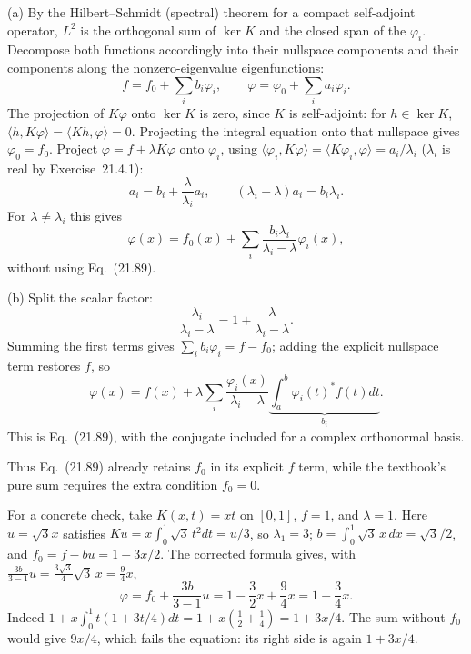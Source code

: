 (a) By the Hilbert--Schmidt (spectral) theorem for a compact
self-adjoint operator, $L^2$ is the orthogonal sum of $\ker K$ and the
closed span of the $\varphi_i$. Decompose both functions accordingly
into their nullspace components and
their components along the nonzero-eigenvalue eigenfunctions:
\[
f=f_0+\sum_i b_i\varphi_i,\qquad
\varphi=\varphi_0+\sum_i a_i\varphi_i.
\]
The projection of $K\varphi$ onto $\ker K$ is zero, since
$K$ is self-adjoint: for $h\in\ker K$,
$\langle h,K\varphi\rangle=\langle Kh,\varphi\rangle=0$.
Projecting the integral equation onto that nullspace gives
$\varphi_0=f_0$.
Project $\varphi=f+\lambda K\varphi$ onto $\varphi_i$, using
$\langle\varphi_i,K\varphi\rangle=\langle K\varphi_i,\varphi\rangle
=a_i/\lambda_i$ ($\lambda_i$ is real by Exercise~21.4.1):
\[
a_i=b_i+\frac{\lambda}{\lambda_i}a_i,\qquad
(\lambda_i-\lambda)a_i=b_i\lambda_i.
\]
For $\lambda\ne\lambda_i$ this gives
\[
\boxed{\varphi(x)=f_0(x)+\sum_i
\frac{b_i\lambda_i}{\lambda_i-\lambda}\varphi_i(x)},
\]
without using Eq.~(21.89).

(b) Split the scalar factor:
\[
\frac{\lambda_i}{\lambda_i-\lambda}
=1+\frac{\lambda}{\lambda_i-\lambda}.
\]
Summing the first terms gives $\sum_ib_i\varphi_i=f-f_0$; adding the
explicit nullspace term restores $f$, so
\[
\varphi(x)=f(x)+\lambda\sum_i
\frac{\varphi_i(x)}{\lambda_i-\lambda}
\underbrace{\int_a^b\varphi_i(t)^*f(t)dt}_{b_i}.
\]
This is Eq.~(21.89), with the conjugate included for a complex
orthonormal basis.

Thus Eq.~(21.89) already retains $f_0$ in its explicit $f$ term,
while the textbook's pure sum requires the extra condition
$f_0=0$.

For a concrete check, take $K(x,t)=xt$ on $[0,1]$,
$f=1$, and $\lambda=1$. Here $u=\sqrt3x$ satisfies
$Ku=x\int_0^1\sqrt3\,t^2dt=u/3$, so $\lambda_1=3$;
$b=\int_0^1\sqrt3\,x\,dx=\sqrt3/2$, and
$f_0=f-bu=1-3x/2$. The corrected formula gives, with
$\frac{3b}{3-1}u=\frac{3\sqrt3}{4}\sqrt3\,x=\frac94x$,
\[
\varphi=f_0+\frac{3b}{3-1}u
=1-\frac32x+\frac94x
=\boxed{1+\frac34x}.
\]
Indeed $1+x\int_0^1t(1+3t/4)dt=1+x(\frac12+\frac14)=1+3x/4$.
The sum without $f_0$ would give $9x/4$, which fails the equation:
its right side is again $1+3x/4$.


